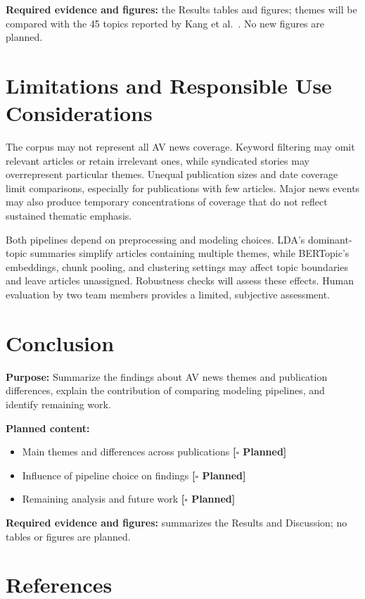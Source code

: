 \documentclass[conference]{IEEEtran}
\newcommand{\planned}{\textcolor{blue!60!black}{\textbf{[$\square$ Planned]}}}
\begin{document}
\textbf{Required evidence and figures:} the Results tables and figures; themes will be compared with the 45 topics reported by Kang et al.~\cite{kang2025unveiling}. No new figures are planned.

\section*{Limitations and Responsible Use Considerations}
The corpus may not represent all AV news coverage. Keyword filtering may omit relevant articles or retain irrelevant ones, while syndicated stories may overrepresent particular themes. Unequal publication sizes and date coverage limit comparisons, especially for publications with few articles. Major news events may also produce temporary concentrations of coverage that do not reflect sustained thematic emphasis.

Both pipelines depend on preprocessing and modeling choices. LDA's dominant-topic summaries simplify articles containing multiple themes, while BERTopic's embeddings, chunk pooling, and clustering settings may affect topic boundaries and leave articles unassigned. Robustness checks will assess these effects. Human evaluation by two team members provides a limited, subjective assessment.

\section*{Conclusion}
\textbf{Purpose:} Summarize the findings about AV news themes and publication differences, explain the contribution of comparing modeling pipelines, and identify remaining work.

\textbf{Planned content:} 
\begin{itemize}
    \item Main themes and differences across publications \planned
    \item Influence of pipeline choice on findings \planned
    \item Remaining analysis and future work \planned
\end{itemize}

\textbf{Required evidence and figures:} summarizes the Results and Discussion; no tables or figures are planned.

\newpage
\section*{References}
\printbibliography[heading=none]
\end{document}
